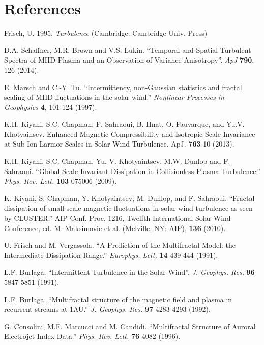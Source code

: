 \documentclass[aps,prl,amsmath,amssymb,reprint,superscriptaddress]{revtex4-1} %
\begin{document}
\section*{References}
\begin{thebibliography}{99}

Frisch, U. 1995, {\it Turbulence} (Cambridge: Cambridge Univ. Press)

 D.A. Schaffner, M.R. Brown and V.S. Lukin. ``Temporal and Spatial Turbulent Spectra of MHD Plasma and an Observation of Variance Anisotropy''. {\it ApJ} {\bf 790}, 126 (2014).

 E. Marsch and C.-Y. Tu. ``Intermittency, non-Gaussian statistics and fractal scaling of MHD fluctuations in the solar wind.'' {\it Nonlinear Processes in Geophysics} {\bf 4}, 101-124 (1997).

 K.H. Kiyani, S.C. Chapman, F. Sahraoui, B. Hnat, O. Fauvarque, and Yu.V. Khotyainsev. Enhanced Magnetic Compressibility and Isotropic Scale Invariance at Sub-Ion Larmor Scales in Solar Wind Turbulence. ApJ. {\bf 763} 10 (2013).

 K.H. Kiyani, S.C. Chapman, Yu. V. Khotyaintsev, M.W. Dunlop and F. Sahraoui. ``Global Scale-Invariant Dissipation in Collisionless Plasma Turbulence.'' {\it Phys. Rev. Lett.} {\bf 103} 075006 (2009). 

 K. Kiyani, S. Chapman, Y. Khotyaintsev, M. Dunlop, and F. Sahraoui. ``Fractal dissipation of small-scale magnetic fluctuations in solar wind turbulence as seen by CLUSTER.'' AIP Conf. Proc. 1216, Twelfth International Solar Wind Conference, ed. M. Maksimovic et al. (Melville, NY: AIP), {\bf 136} (2010).

 U. Frisch and M. Vergassola. ``A Prediction of the Multifractal Model: the Intermediate Dissipation Range.'' {\it Europhys. Lett.} {\bf 14} 439-444 (1991).

 L.F. Burlaga. ``Intermittent Turbulence in the Solar Wind''. {\it J. Geophys. Res.} {\bf 96} 5847-5851 (1991).

 L.F. Burlaga. ``Multifractal structure of the magnetic field and plasma in recurrent streams at 1AU.'' {\it J. Geophys. Res.} {\bf 97} 4283-4293 (1992).

 G. Consolini, M.F. Marcucci and M. Candidi. ``Multifractal Structure of Auroral Electrojet Index Data.'' {\it Phys. Rev. Lett.} {\bf 76} 4082 (1996).


\end{thebibliography}
\end{document}

